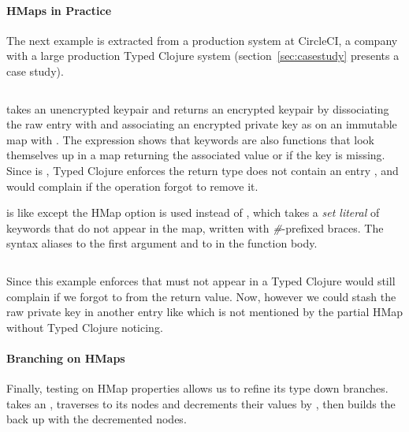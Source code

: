 \paragraph{HMaps in Practice} The next example is extracted from a production system at CircleCI,
a company with a large production Typed Clojure system
(section~\ref{sec:casestudy} presents a case study).

\begin{exmp}
\inputminted[firstline=10,lastline=22]{clojure}{code/demo/src/demo/key.clj}
\label{example:circleci}
\end{exmp}

 takes an unencrypted keypair and returns an encrypted keypair by
dissociating the raw  entry with 
and associating an encrypted private key
as  on an immutable map with .
The expression  shows that keywords are also 
functions that look themselves up in a map returning the associated value or \nil{} if the key is missing.
Since  is , Typed Clojure enforces the return type
does not contain an entry , and would complain if the 
operation forgot to remove it.

is like 
except the  HMap option is used
instead of ,
which takes a \emph{set literal} of keywords that do not appear in the map, written 
with \emph{\#}-prefixed braces.
The syntax 
aliases  to the first argument and  to 
in the function body.

\begin{exmp}
\inputminted[firstline=10,lastline=21]{clojure}{code/demo/src/demo/key2.clj}
\label{example:absentkeys}
\end{exmp}

Since this example enforces that  must not appear
in a 
Typed Clojure would still complain if we forgot to  
from the return value.
Now, however we could stash the raw private key in another entry
like  which is not mentioned by the partial HMap 
without Typed Clojure noticing.

\paragraph{Branching on HMaps} Finally, testing on HMap properties
allows us to refine its type down branches.  takes an
, traverses to its nodes and decrements their values by , then
builds the  back up with the decremented nodes.

